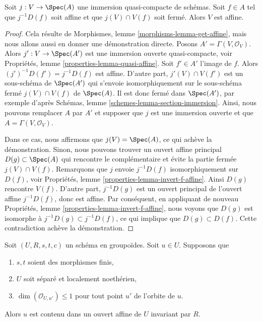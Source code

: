 \begin{lemma}
\label{lemma-get-affine}
Soit $j : V \to \Spec(A)$ une immersion quasi-compacte de schémas.
Soit $f \in A$ tel que $j^{-1}D(f)$ soit affine et que $j(V) \cap V(f)$
soit fermé. Alors $V$ est affine.
\end{lemma}

\begin{proof}
Cela résulte de Morphismes, lemme \ref{morphisms-lemma-get-affine},
mais nous allons aussi en donner une démonstration directe.
Posons $A' = \Gamma(V, \mathcal{O}_V)$. Alors $j' : V \to \Spec(A')$ est une
immersion ouverte quasi-compacte, voir
Propriétés, lemme \ref{properties-lemma-quasi-affine}.
Soit $f' \in A'$ l'image de $f$. Alors $(j')^{-1}D(f') = j^{-1}D(f)$
est affine. D'autre part, $j'(V) \cap V(f')$ est un sous-schéma de
$\Spec(A')$ qui s'envoie isomorphiquement sur le sous-schéma fermé
$j(V) \cap V(f)$ de $\Spec(A)$. Il est donc fermé dans $\Spec(A')$,
par exemple d'après Schémas, lemme \ref{schemes-lemma-section-immersion}.
Ainsi, nous pouvons remplacer $A$ par $A'$ et supposer que $j$ est une immersion ouverte
et que $A = \Gamma(V, \mathcal{O}_V)$.

\medskip\noindent
Dans ce cas, nous affirmons que $j(V) = \Spec(A)$, ce qui achève la démonstration.
Sinon, nous pouvons trouver un ouvert affine principal $D(g) \subset \Spec(A)$
qui rencontre le complémentaire et évite la partie fermée $j(V) \cap V(f)$.
Remarquons que $j$ envoie $j^{-1}D(f)$ isomorphiquement sur $D(f)$, voir
Propriétés, lemme \ref{properties-lemma-invert-f-affine}.
Ainsi $D(g)$ rencontre $V(f)$. D'autre part, $j^{-1}D(g)$
est un ouvert principal de l'ouvert affine $j^{-1}D(f)$, donc est affine.
Par conséquent, en appliquant de nouveau
Propriétés, lemme \ref{properties-lemma-invert-f-affine},
nous voyons que $D(g)$ est isomorphe à $j^{-1}D(g) \subset j^{-1}D(f)$,
ce qui implique que $D(g) \subset D(f)$. Cette contradiction achève
la démonstration.
\end{proof}

\begin{lemma}
\label{lemma-find-affine-codimension-1}
Soit $(U, R, s, t, c)$ un schéma en groupoïdes. Soit $u \in U$. Supposons que
\begin{enumerate}
\item $s, t$ soient des morphismes finis,
\item $U$ soit séparé et localement noethérien,
\item $\dim(\mathcal{O}_{U, u'}) \leq 1$ pour tout point $u'$
de l'orbite de $u$.
\end{enumerate}
Alors $u$ est contenu dans un ouvert affine de $U$ invariant par $R$.
\end{lemma}


